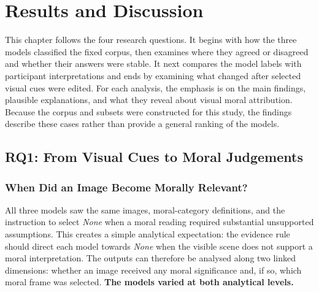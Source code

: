 \chapter{Results and Discussion}
\label{Chap4}

This chapter follows the four research questions. It begins with how the three
models classified the fixed corpus, then examines where they agreed or
disagreed and whether their answers were stable. It next compares the model
labels with participant interpretations and ends by examining what changed
after selected visual cues were edited. For each analysis, the emphasis is on
the main findings, plausible explanations, and what they reveal about visual
moral attribution. Because the corpus and subsets were constructed for this
study, the findings describe these cases rather than provide a general ranking
of the models.


\section{RQ1: From Visual Cues to Moral Judgements}
\label{sec:rq1_results}

\subsection{When Did an Image Become Morally Relevant?}

All three models saw the same images, moral-category definitions, and the
instruction to select \textit{None} when a moral reading required substantial
unsupported assumptions. This creates a simple analytical expectation: the
evidence rule should direct each model towards \textit{None} when the visible
scene does not support a moral interpretation. The outputs can therefore be
analysed along two linked dimensions: whether an image received any moral
significance and, if so, which moral frame was selected. \textbf{The models
varied at both analytical levels.}

